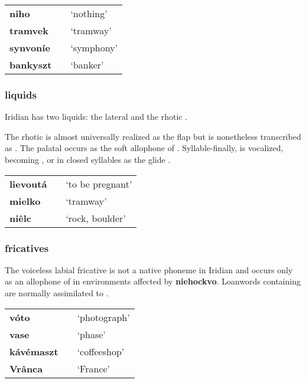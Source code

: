 \begin{center}
	\centering \small
	\begin{tabularx}{0.8\textwidth}{>{\bfseries}YYY}
		niho		&  & `nothing'\\
		tramvek		&&`tramway'\\
		synvoníe		&&`symphony'\\
		bankyszt	&  & `banker'\\
	\end{tabularx}
\end{center}
\subsubsection{liquids}
\par Iridian has two liquids: the lateral  and the rhotic .
\par The rhotic  is almost universally realized as the flap  but is nonetheless transcribed as . The palatal  occurs as the soft allophone of . Syllable-finally,  is vocalized, becoming \pn{\textltilde}, or in closed syllables as the glide .

\begin{center}
	\centering \small
	\begin{tabularx}{0.8\textwidth}{>{\bfseries}YYY}
		lievoutá		&  & `to be pregnant'\\
		mielko		&&`tramway'\\
		niêlc & \textipa{[\nn\~E\~w\ttb{ts}]}&`rock, boulder'\\
	\end{tabularx}
\end{center}

\subsubsection{fricatives}
The voiceless labial fricative  is not a native phoneme in Iridian and occurs only as an allophone of  in environments affected by \textbf{niehockvo}. Loanwords containing  are normally assimilated to .

\begin{center}\small
	\begin{tabularx}{0.8\textwidth}{>{\bfseries}YYY}
		vóto		& 		&`photograph'\\
 		vase		& 			&`phase'\\
 		kávémaszt	& 	&`coffeeshop'\\
 		Vrânca		&  & `France'\\
	\end{tabularx}
\end{center}

